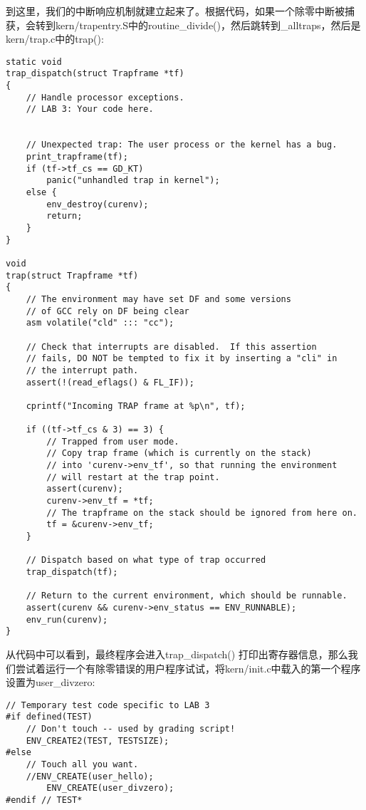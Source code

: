 \documentclass{article}
\newcommand{\funcname}[1]{{\ttfamily \small #1}}
\begin{document}
\begin{CJK*}{UTF8}{gkai}
到这里，我们的中断响应机制就建立起来了。根据代码，如果一个除零中断被捕获，会转到kern/trapentry.S中的\funcname{routine\_divide()}，然后跳转到\funcname{\_alltraps}，然后是kern/trap.c中的\funcname{trap()}:

\begin{lstlisting}[style=ccode, title={\scriptsize \ttfamily \bfseries kern/trap.c}]
static void
trap_dispatch(struct Trapframe *tf)
{
	// Handle processor exceptions.
	// LAB 3: Your code here.
	

	// Unexpected trap: The user process or the kernel has a bug.
	print_trapframe(tf);
	if (tf->tf_cs == GD_KT)
		panic("unhandled trap in kernel");
	else {
		env_destroy(curenv);
		return;
	}
}

void
trap(struct Trapframe *tf)
{
	// The environment may have set DF and some versions
	// of GCC rely on DF being clear
	asm volatile("cld" ::: "cc");

	// Check that interrupts are disabled.  If this assertion
	// fails, DO NOT be tempted to fix it by inserting a "cli" in
	// the interrupt path.
	assert(!(read_eflags() & FL_IF));

	cprintf("Incoming TRAP frame at %p\n", tf);

	if ((tf->tf_cs & 3) == 3) {
		// Trapped from user mode.
		// Copy trap frame (which is currently on the stack)
		// into 'curenv->env_tf', so that running the environment
		// will restart at the trap point.
		assert(curenv);
		curenv->env_tf = *tf;
		// The trapframe on the stack should be ignored from here on.
		tf = &curenv->env_tf;
	}
	
	// Dispatch based on what type of trap occurred
	trap_dispatch(tf);

	// Return to the current environment, which should be runnable.
	assert(curenv && curenv->env_status == ENV_RUNNABLE);
	env_run(curenv);
}

\end{lstlisting}


从代码中可以看到，最终程序会进入\funcname{trap\_dispatch()} 打印出寄存器信息，那么我们尝试着运行一个有除零错误的用户程序试试，将kern/init.c中载入的第一个程序设置为user\_divzero:

\begin{lstlisting}[style=ccode, firstnumber=44, title={\scriptsize \ttfamily \bfseries kern/init.c: i386\_init()}]
	// Temporary test code specific to LAB 3
#if defined(TEST)
	// Don't touch -- used by grading script!
	ENV_CREATE2(TEST, TESTSIZE);
#else
	// Touch all you want.
	//ENV_CREATE(user_hello);
        ENV_CREATE(user_divzero);
#endif // TEST*


\end{lstlisting}
\end{CJK*}
\end{document}
